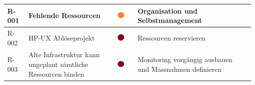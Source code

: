 \begin{table}[H]
{\begin{tabular}{lllllll}
R-001                                                                       & Fehlende Ressourcen                                                                                & \multicolumn{1}{c}{{\includegraphics[width=0.05\linewidth]{source/status_report/main/risk_warning}}} &                         & Organisation und Selbstmanagement                                                                                                                              &                                                                                                                                                                 &                                                                                                                                 \\ \hline
R-002                                                                       & HP-UX Ablöseprojekt                                                                                & {\includegraphics[width=0.05\linewidth]{source/status_report/main/risk_alert}}                       &                         & Ressourcen reservieren                                                                                                                                         &                                                                                                                                                                 &                                                                                                                                 \\ \hline
R-003                                                                       & Alte Infrastruktur kann ungeplant sämtliche Ressourcen binden                                      & {\includegraphics[width=0.05\linewidth]{source/status_report/main/risk_alert}}                       &                         & Monitoring vorgängig ausbauen und Massnahmen definieren                                                                                                        &                                                                                                                                                                 &                                                                                                                                 \\ \hline

\end{tabular}}
\end{table}
